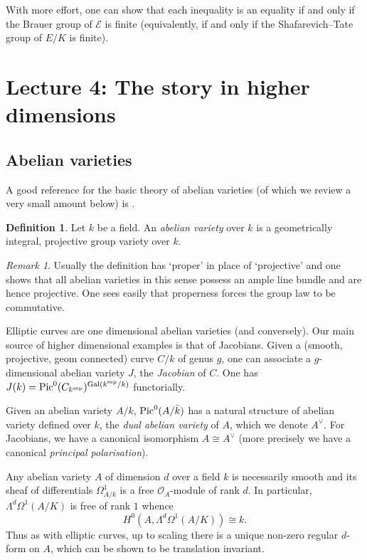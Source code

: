\documentclass[12pt]{amsart}
\numberwithin{equation}{section}
\theoremstyle{remark}
\newtheorem{remark}[equation]{Remark}
\theoremstyle{definition}
\theoremstyle{definition}
\theoremstyle{definition}
\newtheorem{defi}[equation]{Definition}
\theoremstyle{definition}
\theoremstyle{definition}
\theoremstyle{definition}
\theoremstyle{definition}
\begin{document}
With more effort, one can show that each inequality is an equality if and only if the Brauer group  of $\mathcal{E}$ is finite (equivalently, if and only if the Shafarevich--Tate group of $E/K$ is finite). 

\newpage

\section{Lecture 4: The story in higher dimensions}

\subsection{Abelian varieties}

A good reference for the basic theory of abelian varieties (of which we review a very small amount below) is \cite{MR861974}.

\begin{defi}
Let $k$ be a field. An \textit{abelian variety} over $k$ is a geometrically integral, projective group variety over $k$. 
\end{defi}

\begin{remark}
Usually the definition has `proper' in place of `projective' and one shows that all abelian varieties in this sense possess an ample line bundle and are hence projective.  One sees easily that properness forces  the group law to be commutative.
\end{remark}

Elliptic curves are one dimensional abelian varieties (and conversely). Our main source of higher dimensional examples is that of Jacobians. Given a (smooth, projective, geom connected) curve $C/k$ of genus $g$, one can associate a $g$-dimensional abelian variety $J$, the \textit{Jacobian} of $C$. One has $J(k)=\textup{Pic}^0(C_{k^{\textup{sep}}})^{\textup{Gal}(k^{\textup{sep}}/k)}$ functorially. 

Given an abelian variety $A/k$, $\textup{Pic}^0(A/\bar{k})$ has a natural structure of abelian variety defined over $k$, the \textit{dual abelian variety} of $A$, which we denote $A^{\vee}$. For Jacobians, we have a canonical isomorphism $A\cong A^{\vee}$ (more precisely we have a canonical \textit{principal polarisation}).
 
Any abelian variety $A$ of dimension $d$ over a field $k$ is necessarily smooth and its sheaf of differentials $\Omega^1_{A/k}$ is a free $\mathcal{O}_A$-module of rank $d$. In particular, $\Lambda^d\Omega^1(A/K)$ is free of rank $1$ whence
\[H^0(A,\Lambda^d \Omega^1(A/K))\cong k.\]
Thus as with elliptic curves, up to scaling there is a unique non-zero regular $d$-form on  $A$, which can be shown to be translation invariant. 
\end{document}

